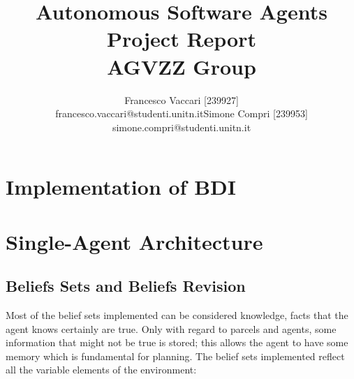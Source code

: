\documentclass[a4paper, 11pt]{article}
\title{\Huge{Autonomous Software Agents} \\ \Large{Project Report} \\ \footnotesize{AGVZZ Group}}
\author{
\begin{tabular}{cc}
\parbox{7cm}{\centering Francesco Vaccari [239927] \\ \small{\centering francesco.vaccari@studenti.unitn.it}} & 
\parbox{7cm}{\centering Simone Compri [239953] \\ \small{\centering simone.compri@studenti.unitn.it}}
\end{tabular}
}
\date{}
\begin{document}
\maketitle
\tableofcontents


\pagebreak

\section{Implementation of BDI}


\pagebreak



\section{Single-Agent Architecture}


\subsection{Beliefs Sets and Beliefs Revision}
Most of the belief sets implemented can be considered knowledge, facts that the agent knows certainly are true. Only with regard to parcels and agents, some information that might not be true is stored; this allows the agent to have some memory which is fundamental for planning. The belief sets implemented reflect all the variable elements of the environment:
\end{document}
